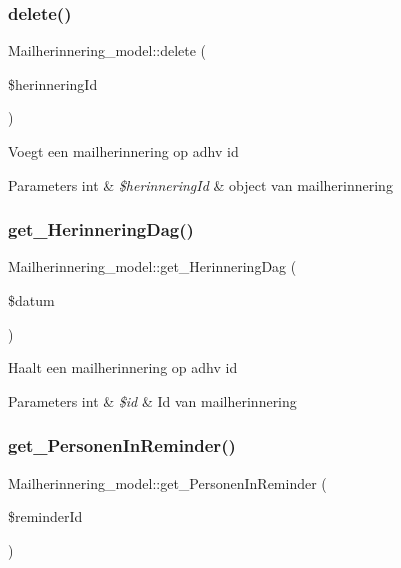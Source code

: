 \subsubsection{\texorpdfstring{delete()}{delete()}}
{\footnotesize\ttfamily Mailherinnering\+\_\+model\+::delete (\begin{DoxyParamCaption}\item[{}]{\$herinnering\+Id }\end{DoxyParamCaption})}

Voegt een mailherinnering op adhv id 
\begin{DoxyParams}[1]{Parameters}
int & {\em \$herinnering\+Id} & object van mailherinnering \\
\hline
\end{DoxyParams}
\mbox{\label{class_mailherinnering__model_a422d531c661ec9d18803bc7c9ec95a82}} 
\subsubsection{\texorpdfstring{get\+\_\+\+Herinnering\+Dag()}{get\_HerinneringDag()}}
{\footnotesize\ttfamily Mailherinnering\+\_\+model\+::get\+\_\+\+Herinnering\+Dag (\begin{DoxyParamCaption}\item[{}]{\$datum }\end{DoxyParamCaption})}

Haalt een mailherinnering op adhv id 
\begin{DoxyParams}[1]{Parameters}
int & {\em \$id} & Id van mailherinnering \\
\hline
\end{DoxyParams}
\mbox{\label{class_mailherinnering__model_ae3c0049788b3d538c73c2b6f78fff595}} 
\subsubsection{\texorpdfstring{get\+\_\+\+Personen\+In\+Reminder()}{get\_PersonenInReminder()}}
{\footnotesize\ttfamily Mailherinnering\+\_\+model\+::get\+\_\+\+Personen\+In\+Reminder (\begin{DoxyParamCaption}\item[{}]{\$reminder\+Id }\end{DoxyParamCaption})}


